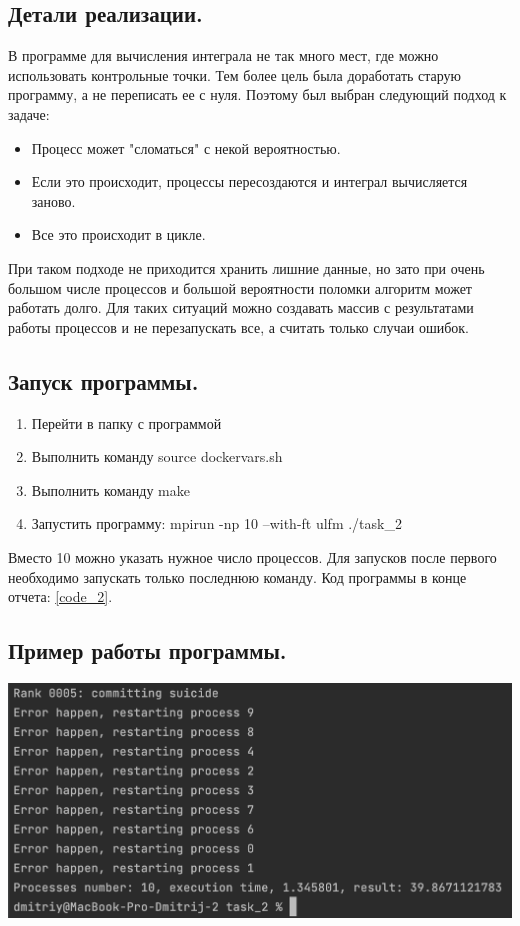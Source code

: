 \documentclass{article}
\begin{document}
\subsection{Детали реализации.}
В программе для вычисления интеграла не так много мест, где можно использовать контрольные точки. Тем более цель была доработать старую программу, а не переписать ее с нуля. Поэтому был выбран следующий подход к задаче:
\begin{itemize}
    \item Процесс может "сломаться" с некой вероятностью.
    \item Если это происходит, процессы пересоздаются и интеграл вычисляется заново.
    \item Все это происходит в цикле.
\end{itemize}
При таком подходе не приходится хранить лишние данные, но зато при очень большом числе процессов и большой вероятности поломки алгоритм может работать долго. Для таких ситуаций можно создавать массив с результатами работы процессов и не перезапускать все, а считать только случаи ошибок.\\

\subsection{Запуск программы.}
\begin{enumerate}
    \item Перейти в папку с программой
    \item Выполнить команду source dockervars.sh
    \item Выполнить команду make
    \item Запустить программу: mpirun -np 10 --with-ft ulfm ./task\_2  
\end{enumerate}
Вместо 10 можно указать нужное число процессов. Для запусков после первого необходимо запускать только последнюю команду.
Код программы в конце отчета: \ref{code_2}.

\subsection{Пример работы программы.}
\includegraphics[width=1\linewidth]{task_2_10.png}
\end{document}
